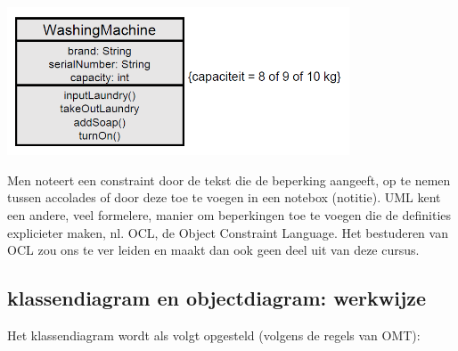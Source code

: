 
\begin{center}
\includegraphics[width=4in]{img/const1}%
\end{center}

Men noteert een constraint door de tekst die de beperking aangeeft, op te nemen tussen accolades of door deze toe te voegen in een notebox (notitie). UML kent een andere, veel formelere, manier om beperkingen toe te voegen die de definities explicieter maken, nl. OCL, de Object Constraint Language.
Het bestuderen van OCL zou ons te ver leiden en maakt dan ook geen deel uit van deze cursus.

\subsection{klassendiagram en objectdiagram: werkwijze}

Het klassendiagram wordt als volgt opgesteld (volgens de regels van OMT):

